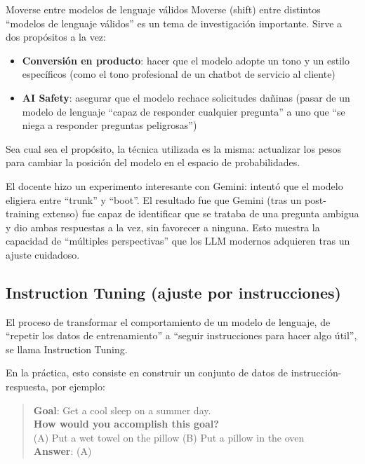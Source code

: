 \begin{knowledgebox}{Moverse entre modelos de lenguaje válidos}
Moverse (shift) entre distintos ``modelos de lenguaje válidos'' es un tema de investigación importante. Sirve a dos propósitos a la vez:
\begin{itemize}
    \item \textbf{Conversión en producto}: hacer que el modelo adopte un tono y un estilo específicos (como el tono profesional de un chatbot de servicio al cliente)
    \item \textbf{AI Safety}: asegurar que el modelo rechace solicitudes dañinas (pasar de un modelo de lenguaje ``capaz de responder cualquier pregunta'' a uno que ``se niega a responder preguntas peligrosas'')
\end{itemize}
Sea cual sea el propósito, la técnica utilizada es la misma: actualizar los pesos para cambiar la posición del modelo en el espacio de probabilidades.
\end{knowledgebox}

El docente hizo un experimento interesante con Gemini: intentó que el modelo eligiera entre ``trunk'' y ``boot''. El resultado fue que Gemini (tras un post-training extenso) fue capaz de identificar que se trataba de una pregunta ambigua y dio ambas respuestas a la vez, sin favorecer a ninguna. Esto muestra la capacidad de ``múltiples perspectivas'' que los LLM modernos adquieren tras un ajuste cuidadoso.

\subsection{Instruction Tuning (ajuste por instrucciones)}

El proceso de transformar el comportamiento de un modelo de lenguaje, de ``repetir los datos de entrenamiento'' a ``seguir instrucciones para hacer algo útil'', se llama Instruction Tuning.

En la práctica, esto consiste en construir un conjunto de datos de instrucción-respuesta, por ejemplo:

\begin{quote}
\textbf{Goal}: Get a cool sleep on a summer day. \\
\textbf{How would you accomplish this goal?} \\
(A) Put a wet towel on the pillow \quad (B) Put a pillow in the oven \\
\textbf{Answer}: (A)
\end{quote}

